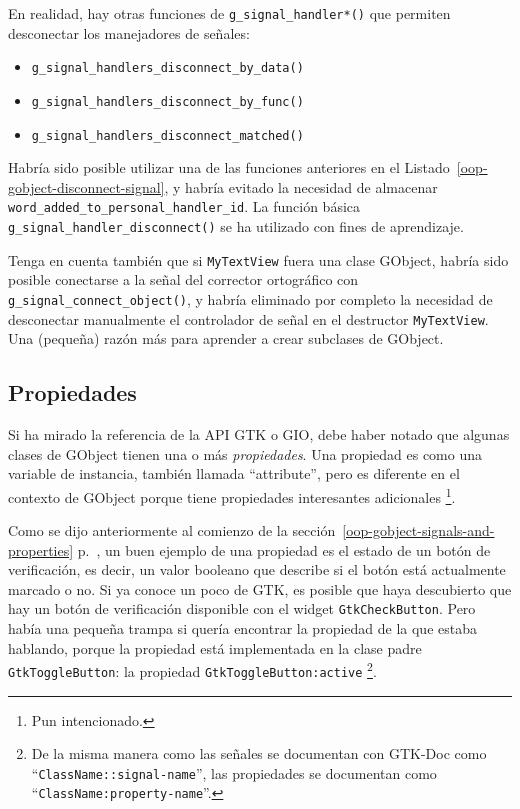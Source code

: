 \vspace{0.7cm}


En realidad, hay otras funciones de \lstinline{g_signal_handler*()} que permiten desconectar los manejadores de señales:
\begin{itemize}
  \item \lstinline{g_signal_handlers_disconnect_by_data()}
  \item \lstinline{g_signal_handlers_disconnect_by_func()}
  \item \lstinline{g_signal_handlers_disconnect_matched()}
\end{itemize}

Habría sido posible utilizar una de las funciones anteriores en el Listado~\ref{oop-gobject-disconnect-signal}, y habría evitado la necesidad de almacenar \lstinline{word_added_to_personal_handler_id}. La función básica \lstinline{g_signal_handler_disconnect()} se ha utilizado con fines de aprendizaje.

Tenga en cuenta también que si \lstinline{MyTextView} fuera una clase GObject, habría sido posible conectarse a la señal del corrector ortográfico con \lstinline{g_signal_connect_object()}, y habría eliminado por completo la necesidad de desconectar manualmente el controlador de señal en el destructor \lstinline{MyTextView}. Una (pequeña) razón más para aprender a crear subclases de GObject.

\subsection{Propiedades}

Si ha mirado la referencia de la API GTK o GIO, debe haber notado que algunas clases de GObject tienen una o más \emph{propiedades}. Una propiedad es como una variable de instancia, también llamada ``attribute'', pero es diferente en el contexto de GObject porque tiene propiedades interesantes adicionales \footnote{Pun intencionado.}.

Como se dijo anteriormente al comienzo de la sección~\ref{oop-gobject-signals-and-properties} p.~\pageref{oop-gobject-signals-and-properties}, un buen ejemplo de una propiedad es el estado de un botón de verificación, es decir, un valor booleano que describe si el botón está actualmente marcado o no. Si ya conoce un poco de GTK, es posible que haya descubierto que hay un botón de verificación disponible con el widget \lstinline{GtkCheckButton}. Pero había una pequeña trampa si quería encontrar la propiedad de la que estaba hablando, porque la propiedad está implementada en la clase padre \lstinline{GtkToggleButton}: la propiedad \lstinline{GtkToggleButton:active} \footnote{De la misma manera como las señales se documentan con GTK-Doc como ``\lstinline{ClassName::signal-name}'', las propiedades se documentan como ``\lstinline{ClassName:property-name}''.}.

